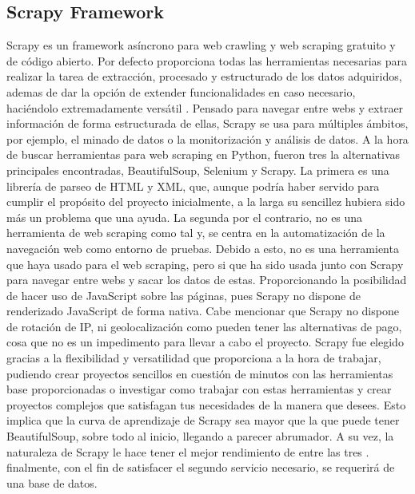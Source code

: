 \subsection{Scrapy Framework}
Scrapy es un framework asíncrono para web crawling y web scraping gratuito y de código abierto. Por defecto proporciona todas las herramientas necesarias para realizar la tarea de extracción, procesado y estructurado de los datos adquiridos, ademas de dar la opción de extender funcionalidades en caso necesario, haciéndolo extremadamente versátil \cite{yang2019design}. Pensado para navegar entre webs y extraer información de forma estructurada de ellas, Scrapy se usa para múltiples ámbitos, por ejemplo, el minado de datos o la monitorización y análisis de datos.\newline
\newline
A la hora de buscar herramientas para web scraping en Python, fueron tres la alternativas principales encontradas, BeautifulSoup, Selenium y Scrapy. La primera es una librería de parseo de HTML y XML, que, aunque podría haber servido para cumplir el propósito del proyecto inicialmente, a la larga su sencillez hubiera sido más un problema que una ayuda.
\newline
\newline
La segunda por el contrario, no es una herramienta de web scraping como tal y, se centra en la automatización de la navegación web como entorno de pruebas. Debido a esto, no es una herramienta que haya usado para el web scraping, pero si que ha sido usada junto con Scrapy para navegar entre webs y sacar los datos de estas. Proporcionando la posibilidad de hacer uso de JavaScript sobre las páginas, pues Scrapy no dispone de renderizado JavaScript de forma nativa. Cabe mencionar que Scrapy no dispone de rotación de IP, ni geolocalización como pueden tener las alternativas de pago, cosa que no es un impedimento para llevar a cabo el proyecto.
\newline
\newline
Scrapy fue elegido gracias a la flexibilidad y versatilidad que proporciona a la hora de trabajar, pudiendo crear proyectos sencillos en cuestión de minutos con las herramientas base proporcionadas o investigar como trabajar con estas herramientas y crear proyectos complejos que satisfagan tus necesidades de la manera que desees. Esto implica que la curva de aprendizaje de Scrapy sea mayor que la que puede tener BeautifulSoup, sobre todo al inicio, llegando a parecer abrumador. A su vez, la naturaleza de Scrapy le hace tener el mejor rendimiento de entre las tres \cite{glez2014web}. finalmente, con el fin de satisfacer el segundo servicio necesario, se requerirá de una base de datos.

